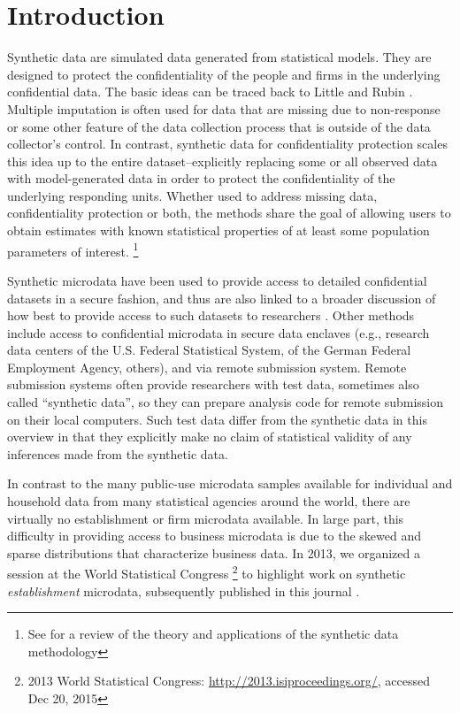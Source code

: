\documentclass[article,letter]{llncs}
\begin{document}
\clearpage
\section{Introduction}

Synthetic data are simulated data generated from statistical models. They are designed to protect the confidentiality of the people and firms in the underlying confidential data. The basic ideas can be traced back to   Little \cite{little93} and Rubin \cite{rubin93}. 
Multiple imputation is often used for data that are missing due to non-response or some other feature of the data collection process that is outside of the data collector's control. In contrast, synthetic data for confidentiality protection scales this idea up to the entire dataset--explicitly replacing some or all observed data with model-generated data in order to protect the confidentiality of the underlying responding units. 
Whether used to address missing data, confidentiality protection or both, the methods share the goal of allowing users to obtain estimates with known statistical properties of at least some population parameters of interest.%
\footnote{See \cite{dre:2011} for a review of the theory and applications of the synthetic data methodology}

Synthetic microdata have been used to provide access to detailed confidential datasets in a secure fashion, and thus are also linked to a broader discussion of how best to provide access to such datasets to researchers  \cite{Bender2009,Vilhuber2013,AbowdLane2004,AbowdSchmutte_BPEA2015}. Other methods include access to confidential microdata in secure data enclaves (e.g., research data centers of the U.S. Federal Statistical System, of the  German Federal Employment Agency, others), and via remote submission system. Remote submission systems often provide researchers with test data, sometimes also called ``synthetic data'', so they can  prepare analysis code for remote submission on their local computers. Such test data differ from the synthetic data in this overview in that they explicitly make no claim of statistical validity of any inferences made from the synthetic data. 

In contrast to the many public-use microdata samples available for individual and household data from many statistical agencies around the world, there are virtually no establishment or firm microdata available. 
In large part, this difficulty in providing access to business microdata is due to the skewed and sparse distributions that characterize business data. In 2013, we organized a session at the World Statistical Congress%
\footnote{2013 World Statistical Congress: \url{http://2013.isiproceedings.org/}, accessed Dec 20, 2015}   to highlight work on synthetic \emph{establishment} microdata, subsequently published in this journal \cite{SJIAOS-2014a,SJIAOS-2014b,SJIAOS-2014c,SJIAOS-2014d,SJIAOS-2014e}. 
\end{document}
